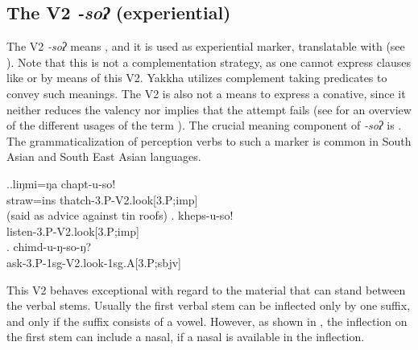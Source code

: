 \subsection{The V2 \emph{-soʔ}  (experiential)}\label{V2-look}%

The V2 \emph{-soʔ} means , and it is used as experiential marker, translatable with  (see \Next). Note that this is not a complementation strategy,  as one cannot express clauses like  or  by means of  this V2. Yakkha utilizes complement taking predicates to convey such meanings. The V2 is also not a means to express a conative, since it neither  reduces the valency nor implies that the attempt fails (see \citet{Vincent2013_Conative} for an overview of the different usages of the term ). The crucial meaning component of \emph{-soʔ} is . The grammaticalization of  perception verbs to such a marker is common in South Asian and South East Asian languages. 

\ex.\ag.liŋmi=ŋa chapt-u-so!\\
straw{\sc =ins} thatch{\sc -3.P-V2.look[3.P;imp]}\\
 (said as advice against tin roofs)
\bg. kheps-u-so!\\
listen{\sc-3.P-V2.look[3.P;imp]}\\
\bg. chimd-u-ŋ-so-ŋ?\\
ask{\sc -3.P-1sg-V2.look-1sg.A[3.P;sbjv]}\\

This V2 behaves exceptional with regard to the material that can stand between the verbal stems. Usually the first verbal stem can be inflected only by one suffix, and only if the suffix consists of a vowel. However, as shown in \Last[c], the inflection on the first stem can include a nasal, if a nasal is available in the inflection.



